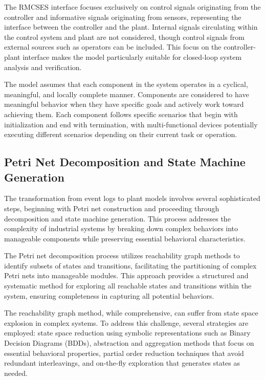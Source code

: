 The RMCSES interface focuses exclusively on control signals originating from the controller and informative signals originating from sensors, representing the interface between the controller and the plant. Internal signals circulating within the control system and plant are not considered, though control signals from external sources such as operators can be included. This focus on the controller-plant interface makes the model particularly suitable for closed-loop system analysis and verification.

The model assumes that each component in the system operates in a cyclical, meaningful, and locally complete manner. Components are considered to have meaningful behavior when they have specific goals and actively work toward achieving them. Each component follows specific scenarios that begin with initialization and end with termination, with multi-functional devices potentially executing different scenarios depending on their current task or operation.

\subsection{Petri Net Decomposition and State Machine Generation}

The transformation from event logs to plant models involves several sophisticated steps, beginning with Petri net construction and proceeding through decomposition and state machine generation. This process addresses the complexity of industrial systems by breaking down complex behaviors into manageable components while preserving essential behavioral characteristics.

The Petri net decomposition process utilizes reachability graph methods to identify subsets of states and transitions, facilitating the partitioning of complex Petri nets into manageable modules. This approach provides a structured and systematic method for exploring all reachable states and transitions within the system, ensuring completeness in capturing all potential behaviors.

The reachability graph method, while comprehensive, can suffer from state space explosion in complex systems. To address this challenge, several strategies are employed: state space reduction using symbolic representations such as Binary Decision Diagrams (BDDs), abstraction and aggregation methods that focus on essential behavioral properties, partial order reduction techniques that avoid redundant interleavings, and on-the-fly exploration that generates states as needed.

